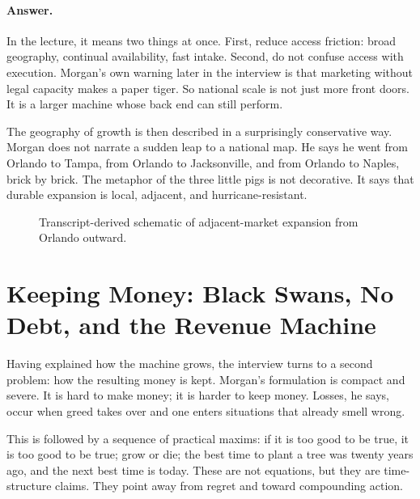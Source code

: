 \paragraph{Answer.} In the lecture, it means two things at once. First, reduce access friction: broad geography, continual availability, fast intake. Second, do not confuse access with execution. Morgan's own warning later in the interview is that marketing without legal capacity makes a paper tiger. So national scale is not just more front doors. It is a larger machine whose back end can still perform.

The geography of growth is then described in a surprisingly conservative way. Morgan does not narrate a sudden leap to a national map. He says he went from Orlando to Tampa, from Orlando to Jacksonville, and from Orlando to Naples, brick by brick. The metaphor of the three little pigs is not decorative. It says that durable expansion is local, adjacent, and hurricane-resistant.

\begin{figure}
\centering
{}
\caption{Transcript-derived schematic of adjacent-market expansion from Orlando outward.}
\label{fig:brick-scale}
\end{figure}

\section{Keeping Money: Black Swans, No Debt, and the Revenue Machine}

Having explained how the machine grows, the interview turns to a second problem: how the resulting money is kept. Morgan's formulation is compact and severe. It is hard to make money; it is harder to keep money. Losses, he says, occur when greed takes over and one enters situations that already smell wrong.

This is followed by a sequence of practical maxims: if it is too good to be true, it is too good to be true; grow or die; the best time to plant a tree was twenty years ago, and the next best time is today. These are not equations, but they are time-structure claims. They point away from regret and toward compounding action.

